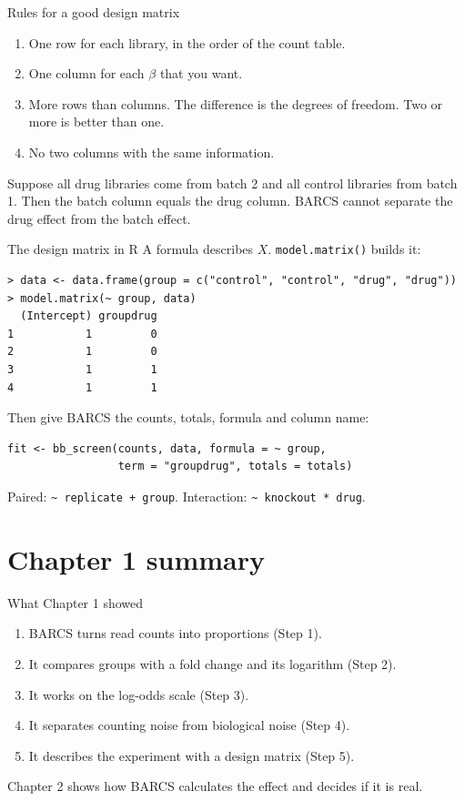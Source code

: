 \documentclass[aspectratio=169,11pt]{beamer}
\begin{document}
\begin{frame}{Rules for a good design matrix}
\begin{enumerate}
\item One row for each library, in the order of the count table.
\item One column for each $\beta$ that you want.
\item More rows than columns. The difference is the degrees of freedom.
  Two or more is better than one.
\item No two columns with the same information.
\end{enumerate}
\medskip
\begin{remember}
Suppose all drug libraries come from batch 2 and all control libraries from
batch 1. Then the batch column equals the drug column. BARCS cannot
separate the drug effect from the batch effect.
\end{remember}
\end{frame}

\begin{frame}[fragile]{The design matrix in R}
\small A \alert{formula} describes $X$. \texttt{model.matrix()} builds it:
\footnotesize
\begin{verbatim}
> data <- data.frame(group = c("control", "control", "drug", "drug"))
> model.matrix(~ group, data)
  (Intercept) groupdrug
1           1         0
2           1         0
3           1         1
4           1         1
\end{verbatim}
\small Then give BARCS the counts, totals, formula and column name:
\footnotesize
\begin{verbatim}
fit <- bb_screen(counts, data, formula = ~ group,
                 term = "groupdrug", totals = totals)
\end{verbatim}
\small Paired: \texttt{\textasciitilde\ replicate + group}.\quad
Interaction: \texttt{\textasciitilde\ knockout * drug}.
\end{frame}

\section{Chapter 1 summary}

\begin{frame}{What Chapter 1 showed}
\begin{enumerate}
\item BARCS turns read counts into proportions (Step 1).
\item It compares groups with a fold change and its logarithm (Step 2).
\item It works on the log-odds scale (Step 3).
\item It separates counting noise from biological noise (Step 4).
\item It describes the experiment with a design matrix (Step 5).
\end{enumerate}
\medskip
\alert{Chapter 2} shows how BARCS calculates the effect and decides if it
is real.
\end{frame}
\end{document}
